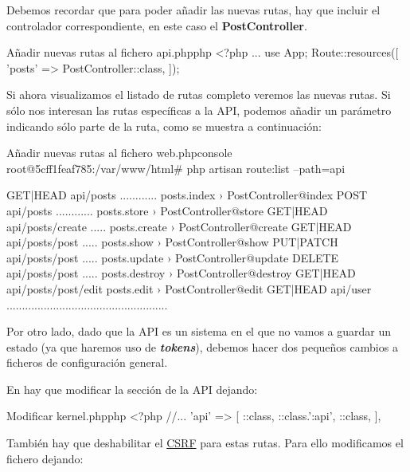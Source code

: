 Debemos recordar que para poder añadir las nuevas rutas, hay que incluir el controlador correspondiente, en este caso el \textbf{PostController}.

\begin{mycode}{Añadir nuevas rutas al fichero api.php}{php}{}
<?php
...
use App\Http\Controllers\PostController;
Route::resources([
    'posts' => PostController::class,
]);
\end{mycode}

Si ahora visualizamos el listado de rutas completo veremos las nuevas rutas. Si sólo nos interesan las rutas específicas a la API, podemos añadir un parámetro indicando sólo parte de la ruta, como se muestra a continuación:


\begin{mycode}{Añadir nuevas rutas al fichero web.php}{console}{{\small }}
root@5cff1feaf785:/var/www/html# php artisan route:list --path=api

GET|HEAD        api/posts ............ posts.index › PostController@index
POST            api/posts ............ posts.store › PostController@store
GET|HEAD        api/posts/create ..... posts.create › PostController@create
GET|HEAD        api/posts/{post} ..... posts.show › PostController@show
PUT|PATCH       api/posts/{post} ..... posts.update › PostController@update
DELETE          api/posts/{post} ..... posts.destroy › PostController@destroy
GET|HEAD        api/posts/{post}/edit  posts.edit › PostController@edit
GET|HEAD        api/user ....................................................
\end{mycode}

Por otro lado, dado que la API es un sistema en el que no vamos a guardar un estado (ya que haremos uso de \textit{\textbf{tokens}}), debemos hacer dos pequeños cambios a ficheros de configuración general.


En  hay que modificar la sección de la API dejando:

\begin{mycode}{Modificar kernel.php}{php}{\small}
<?php
//...
'api' => [
    \Laravel\Sanctum\Http\Middleware\EnsureFrontendRequestsAreStateful::class,
    \Illuminate\Routing\Middleware\ThrottleRequests::class.':api',
    \Illuminate\Routing\Middleware\SubstituteBindings::class,
],
\end{mycode}

También hay que deshabilitar el \href{https://en.wikipedia.org/wiki/Cross-site\_request\_forgery}{CSRF} para estas rutas. Para ello modificamos el fichero  dejando:

